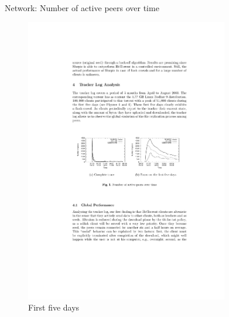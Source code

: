 \begin{frame}{Network: Number of active peers over time}
	
\begin{figure}	
	\includegraphics[width=0.79\textwidth]{figs/10/bt-fig2}
	\caption{First five days}
\end{figure}	
	
\end{frame}


